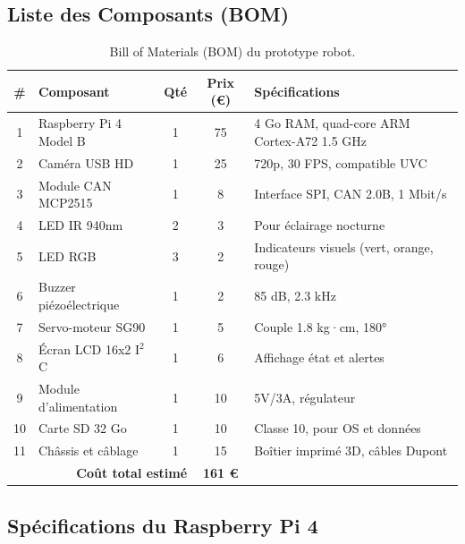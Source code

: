 \documentclass[12pt,a4paper,twoside]{report}
\begin{document}
\subsection{Liste des Composants (BOM)}

\begin{table}[H]
\centering
\caption{Bill of Materials (BOM) du prototype robot.}
\label{tab:bom}
\renewcommand{\arraystretch}{1.3}
\begin{tabularx}{\textwidth}{|c|l|c|c|X|}
\hline
\rowcolor{stellantisblue!15}
\textbf{\#} & \textbf{Composant} & \textbf{Qté} & \textbf{Prix (€)} & \textbf{Spécifications} \\
\hline
1 & Raspberry Pi 4 Model B & 1 & 75 & 4 Go RAM, quad-core ARM Cortex-A72 1.5 GHz \\
\hline
2 & Caméra USB HD & 1 & 25 & 720p, 30 FPS, compatible UVC \\
\hline
3 & Module CAN MCP2515 & 1 & 8 & Interface SPI, CAN 2.0B, 1 Mbit/s \\
\hline
4 & LED IR 940nm & 2 & 3 & Pour éclairage nocturne \\
\hline
5 & LED RGB & 3 & 2 & Indicateurs visuels (vert, orange, rouge) \\
\hline
6 & Buzzer piézoélectrique & 1 & 2 & 85 dB, 2.3 kHz \\
\hline
7 & Servo-moteur SG90 & 1 & 5 & Couple 1.8 kg·cm, 180° \\
\hline
8 & Écran LCD 16x2 I$^2$C & 1 & 6 & Affichage état et alertes \\
\hline
9 & Module d'alimentation & 1 & 10 & 5V/3A, régulateur \\
\hline
10 & Carte SD 32 Go & 1 & 10 & Classe 10, pour OS et données \\
\hline
11 & Châssis et câblage & 1 & 15 & Boîtier imprimé 3D, câbles Dupont \\
\hline
\multicolumn{3}{|r|}{\textbf{Coût total estimé}} & \textbf{161 €} & \\
\hline
\end{tabularx}
\end{table}

\subsection{Spécifications du Raspberry Pi 4}
\end{document}
